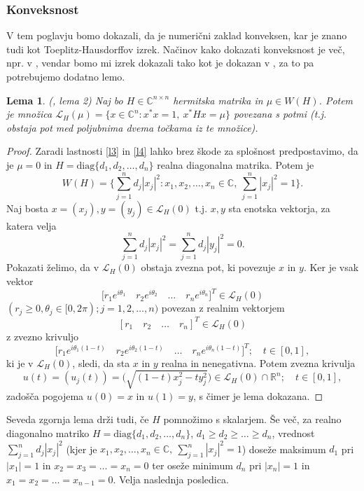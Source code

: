 \documentclass[12pt,a4paper]{amsart}
\theoremstyle{definition}
\theoremstyle{plain}
\newtheorem{lema}[definicija]{Lema}
\newcommand{\LH}{\mathcal{L}}
\newcommand{\R}{\mathbb R}
\newcommand{\C}{\mathbb C}
\begin{document}
\subsubsection{Konveksnost}
V tem poglavju bomo dokazali, da je numerični zaklad konveksen, kar je znano tudi kot Toeplitz-Hausdorffov izrek. 
Načinov kako dokazati konveksnost je več, npr. v \cite{num}, vendar bomo mi izrek dokazali tako kot je dokazan v \cite{zaloga}, za to pa potrebujemo dodatno lemo. 
\begin{lema}(\cite{zaloga}, lema 2)
Naj bo $H\in \C^{n\times n}$ hermitska matrika in $\mu \in W(H)$. Potem je množica $\LH _{H}(\mu)=\{x\in \C^n \! : x^\ast x=1,\ x^\ast Hx=\mu\}$ povezana s potmi (t.j. obstaja pot med poljubnima dvema točkama iz te množice).%
\end{lema}

\begin{proof}
Zaradi lastnosti \ref{l3} in \ref{l4} lahko brez škode za splošnost predpostavimo, da je $\mu=0$ in $H=\text{diag}\{d_1,d_2,\dots,d_n\}$ realna diagonalna matrika.
Potem je 
$$W(H)=\Big\{ \sum_{j=1}^{n} d_j|x_j|^2: x_1,x_2,\dots,x_n \in \C,\ \sum_{j=1}^{n} |x_j|^2=1\Big \}.$$
Naj bosta $x=(x_j), y=(y_j)\in \LH_{H}(0)$ t.j. $x,y$ sta enotska vektorja, za katera velja 
$$\sum_{j=1}^{n} d_j|x_j|^2=\sum_{j=1}^{n} d_j|y_j|^2=0.$$
 Pokazati želimo, da v $\LH_{H}(0)$ obstaja zvezna pot, ki povezuje $x$ in $y$. Ker je vsak vektor 
$$\Big[r_1 e^{i\theta_1}\quad  r_2 e^{i\theta_2}\quad  \dots\quad r_n e^{i\theta_n}\Big]^T \in \LH_{H}(0)$$  
$(r_j \geq 0, \theta_j\in [0, 2\pi); j=1,2,\dots,n)$ povezan z realnim vektorjem 
$$[r_1 \quad r_2 \quad \dots \quad r_n]^T \in \LH_{H}(0)$$
 z zvezno krivuljo
$$\Big[r_1 e^{i\theta_1(1-t)}\quad  r_2 e^{i\theta_2(1-t)}\quad  \dots\quad  r_n e^{i\theta_n(1-t)}\Big]^T; \quad t\in[0,1],$$
ki je v $\LH_{H}(0)$, sledi, da sta $x$ in $y$ realna in nenegativna. Potem zvezna krivulja
$$u(t)=(u_j(t))=\Big(\sqrt{(1-t)x^2_j -ty^2_j}\Big) \in \LH_{H}(0)\cap \R^n ; \quad t\in [0,1],$$
zadošča pogojema $u (0)=x$ in $u (1) =y$, s čimer je lema dokazana.
\end{proof}

Seveda zgornja lema drži tudi, če $H$ pomnožimo s skalarjem. Še več, za realno diagonalno matriko $H=\text{diag}\{d_1,d_2,\dots,d_n\}$, $d_1\geq d_2\geq \dots \geq d_n$, vrednost $\sum_{j=1}^{n} d_j|x_j|^2$ 
(kjer je $x_1,x_2,\dots, x_n \in \C,\ \sum_{j=1}^{n}|x_j|^2 =1$) doseže maksimum $d_1$ pri $|x_1|=1$ in $x_2=x_3=\dots=x_n=0$ ter oseže minimum $d_n$ pri $|x_n|=1$ in $x_1=x_2=\dots=x_{n-1}=0$. Velja naslednja posledica.
\end{document}
